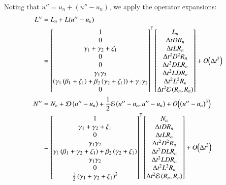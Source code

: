 \documentclass[letterpaper,11pt]{amsart}
\newcommand{\trans}[1]{{#1}^{\ensuremath{\mathsf{T}}}}
\newcommand{\order}[2]{\ensuremath{O\!\left( {#1}^{#2} \right)}}
\begin{document}
Noting that $u'' = u_{n} + \left( u'' - u_{n} \right)$,
we apply the operator expansions:
\begin{subequations}
\begin{align}
  L''
  &=
  L_{n}
  +
  L(u''-u_{n})
\\
&=
\trans{\begin{bmatrix}
  1 \\
  0 \\
  \gamma_{1} + \gamma_{2} + \zeta_{1} \\
  0 \\
  0 \\
  \gamma_{1} \gamma_{2} \\
    \left(
       \gamma_{1} \left(\beta_{1}+\zeta_{1}\right)
      +\beta_{2} \left(\gamma_{2}+\zeta_{1}\right)
    \right)
  + \gamma_{1} \gamma_{2} \\
  0
\end{bmatrix}}
\begin{bmatrix}
  L_{n} \\
  \Delta{}t D R_{n} \\
  \Delta{}t L R_{n} \\
  \Delta{}t^{2} D^{2} R_{n} \\
  \Delta{}t^{2} D L R_{n} \\
  \Delta{}t^{2} L D R_{n} \\
  \Delta{}t^{2} L^{2} R_{n} \\
  \Delta{}t^{2} \mathcal{E}\left( R_{n}, R_{n} \right)
\end{bmatrix}
  + \order{\Delta{}t}{3}
\\
  N''
  &=
  N_{n}
  + \mathcal{D} \left( u'' - u_{n} \right)
  + \frac{1}{2} \mathcal{E} \left( u''-u_{n}, u''-u_{n} \right)
  + \order{\left(u''-u_{n}\right)}{3}
\\
  &=
\trans{\begin{bmatrix}
  1 \\
  \gamma_{1} + \gamma_{2} + \zeta_{1} \\
  0 \\
  \gamma_{1} \gamma_{2} \\
    \gamma_{1} \left(\beta_{1} + \gamma_{2} + \zeta_{1}\right)
  + \beta_{2} \left(\gamma_{2} + \zeta_{1}\right) \\
  \gamma_{1} \gamma_{2} \\
  0 \\
  \frac{1}{2} \left( \gamma_{1} + \gamma_{2} + \zeta_{1} \right)^{2}
\end{bmatrix}}
\begin{bmatrix}
  N_{n} \\
  \Delta{}t D R_{n} \\
  \Delta{}t L R_{n} \\
  \Delta{}t^{2} D^{2} R_{n} \\
  \Delta{}t^{2} D L R_{n} \\
  \Delta{}t^{2} L D R_{n} \\
  \Delta{}t^{2} L^{2} R_{n} \\
  \Delta{}t^{2} \mathcal{E}\left( R_{n}, R_{n} \right)
\end{bmatrix}
  + \order{\Delta{}t}{3}
\notag
\end{align}
\end{subequations}
\end{document}
